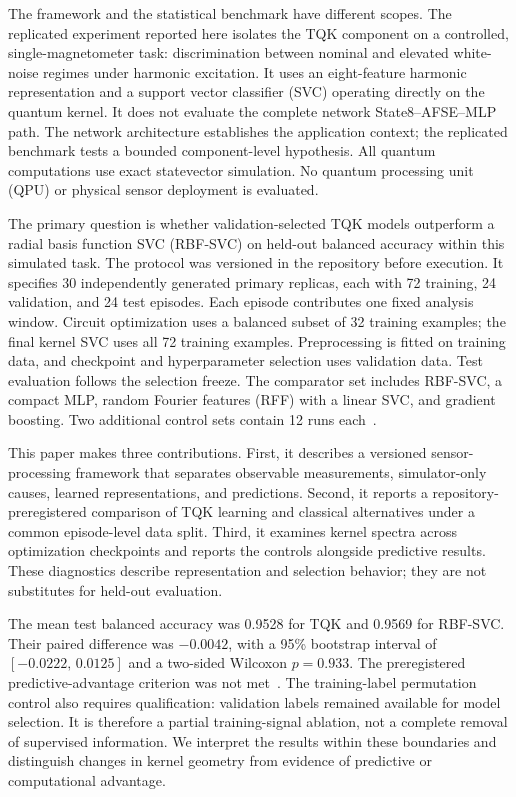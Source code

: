 The framework and the statistical benchmark have different scopes. The replicated experiment reported here isolates the TQK component on a controlled, single-magnetometer task: discrimination between nominal and elevated white-noise regimes under harmonic excitation. It uses an eight-feature harmonic representation and a support vector classifier (SVC) operating directly on the quantum kernel. It does not evaluate the complete network State8--AFSE--MLP path. The network architecture establishes the application context; the replicated benchmark tests a bounded component-level hypothesis. All quantum computations use exact statevector simulation. No quantum processing unit (QPU) or physical sensor deployment is evaluated.

The primary question is whether validation-selected TQK models outperform a radial basis function SVC (RBF-SVC) on held-out balanced accuracy within this simulated task. The protocol was versioned in the repository before execution. It specifies 30 independently generated primary replicas, each with 72 training, 24 validation, and 24 test episodes. Each episode contributes one fixed analysis window. Circuit optimization uses a balanced subset of 32 training examples; the final kernel SVC uses all 72 training examples. Preprocessing is fitted on training data, and checkpoint and hyperparameter selection uses validation data. Test evaluation follows the selection freeze. The comparator set includes RBF-SVC, a compact MLP, random Fourier features (RFF) with a linear SVC, and gradient boosting. Two additional control sets contain 12 runs each~\cite{aqse2026canonical}.

This paper makes three contributions. First, it describes a versioned sensor-processing framework that separates observable measurements, simulator-only causes, learned representations, and predictions. Second, it reports a repository-preregistered comparison of TQK learning and classical alternatives under a common episode-level data split. Third, it examines kernel spectra across optimization checkpoints and reports the controls alongside predictive results. These diagnostics describe representation and selection behavior; they are not substitutes for held-out evaluation.

The mean test balanced accuracy was 0.9528 for TQK and 0.9569 for RBF-SVC. Their paired difference was $-0.0042$, with a 95\% bootstrap interval of $[-0.0222,\,0.0125]$ and a two-sided Wilcoxon $p=0.933$. The preregistered predictive-advantage criterion was not met~\cite{aqse2026canonical}. The training-label permutation control also requires qualification: validation labels remained available for model selection. It is therefore a partial training-signal ablation, not a complete removal of supervised information. We interpret the results within these boundaries and distinguish changes in kernel geometry from evidence of predictive or computational advantage.
